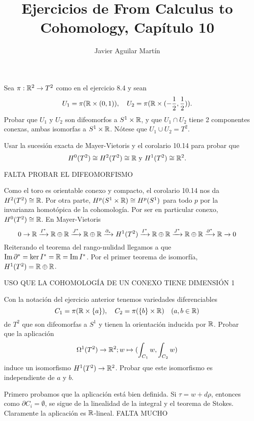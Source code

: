 \documentclass[twoside]{article}
\begin{document}
\title{Ejercicios de From Calculus to Cohomology, Capítulo 10}
\author{Javier Aguilar Martín}
\maketitle

\begin{ejercicio}{10.1}
Sea $\pi:\mathbb{R}^2\to T^2$ como en el ejercicio 8.4 y sean
\[
U_1=\pi(\mathbb{R}\times (0,1)),\quad U_2=\pi(\mathbb{R}\times (-\frac{1}{2},\frac{1}{2})).
\]
Probar que $U_1$ y $U_2$ son difeomorfos a $S^1\times\mathbb{R}$, y que $U_1\cap U_2$ tiene 2 componentes conexas, ambas isomorfas a $S^1\times\mathbb{R}$. Nótese que $U_1\cup U_2=T^2$.

Usar la sucesión exacta de Mayer-Vietoris y el corolario 10.14 para probar que
\[
H^0(T^2)\cong H^2(T^2)\cong\mathbb{R}\text{ y }H^1(T^2)\cong\mathbb{R}^2.
\]
\end{ejercicio}
\begin{solucion}
FALTA PROBAR EL DIFEOMORFISMO

Como el toro es orientable conexo y compacto, el corolario 10.14 nos da $H^2(T^2)\cong\mathbb{R}$. Por otra parte, $H^p(S^1\times\mathbb{R})\cong H^p(S^1)$ para todo $p$ por la invarianza homotópica de la cohomología. Por ser en particular conexo, $H^0(T^2)\cong\mathbb{R}$. En Mayer-Vietoris
\[
0\to\mathbb{R}\xrightarrow{I^*}\mathbb{R}\oplus\mathbb{R}\xrightarrow{J^*}\mathbb{R}\oplus\mathbb{R}\xrightarrow{\partial_*}H^1(T^2)\xrightarrow{I^*}\mathbb{R}\oplus\mathbb{R}\xrightarrow{J^*}\mathbb{R}\oplus\mathbb{R}\xrightarrow{\partial^*}\mathbb{R}\xrightarrow{} 0
\]
Reiterando el teorema del rango-nulidad llegamos a que $\operatorname{Im}{\partial^*}=\ker{I^*}=\mathbb{R}=\operatorname{Im}{I^*}$. Por el primer teorema de isomorfía, $H^1(T^2)=\mathbb{R}\oplus\mathbb{R}$. 

USO QUE LA COHOMOLOGÍA DE UN CONEXO TIENE DIMENSIÓN 1

\end{solucion}
\newpage


\begin{ejercicio}{10.2}
Con la notación del ejercicio anterior tenemos variedades diferenciables
\[
C_1=\pi(\mathbb{R}\times\{a\}),\quad C_2=\pi(\{b\}\times\mathbb{R})\quad (a,b\in\mathbb{R})
\]
de $T^2$ que son difeomorfas a $S^1$ y tienen la orientación inducida por $\mathbb{R}$. Probar que la aplicación
\[
\Omega^1(T^2)\to\mathbb{R}^2; w\mapsto (\int_{C_1}w, \int_{C_2}w)
\]
induce un isomorfismo $H^1(T^2)\to \mathbb{R}^2$. Probar que este isomorfismo es independiente de $a$ y $b$.
\end{ejercicio}
\begin{solucion}
Primero probamos que la aplicación está bien definida. Si $\tau=w+d\rho$, entonces como $\partial C_i=\emptyset$, se sigue de la linealidad de la integral y el teorema de Stokes. Claramente la aplicación es $\mathbb{R}$-lineal. 
FALTA MUCHO
\end{solucion}
\newpage
\end{document}
